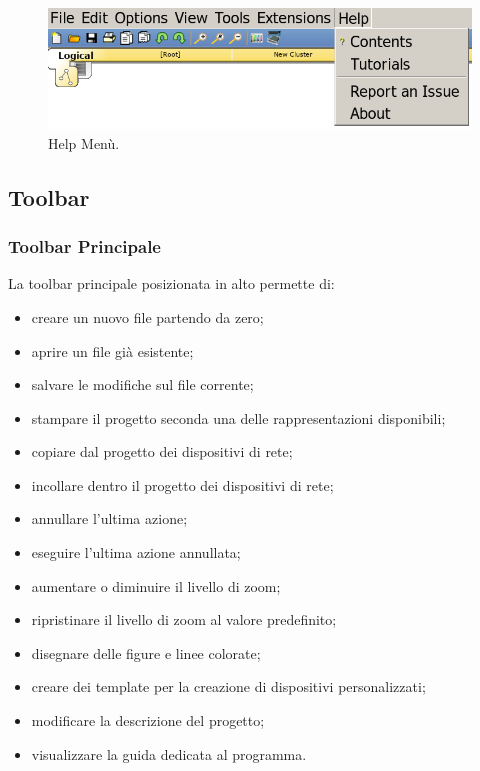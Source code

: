 \begin{figure}[htbp]
    \centerline{\includegraphics[scale=.3]{images/02.packet-tracer/help.png}}
    \caption{Help Menù.}
\end{figure}

\subsection{Toolbar}

\subsubsection{Toolbar Principale}
La toolbar principale posizionata in alto permette di:

\begin{itemize}
    \item creare un nuovo file partendo da zero;
    \item aprire un file già esistente;
    \item salvare le modifiche sul file corrente;
    \item stampare il progetto seconda una delle rappresentazioni disponibili;
    \item copiare dal progetto dei dispositivi di rete;
    \item incollare dentro il progetto dei dispositivi di rete;
    \item annullare l'ultima azione;
    \item eseguire l'ultima azione annullata;
    \item aumentare o diminuire il livello di zoom;
    \item ripristinare il livello di zoom al valore predefinito;
    \item disegnare delle figure e linee colorate;
    \item creare dei template per la creazione di dispositivi personalizzati;
    \item modificare la descrizione del progetto;
    \item visualizzare la guida dedicata al programma.
\end{itemize}

